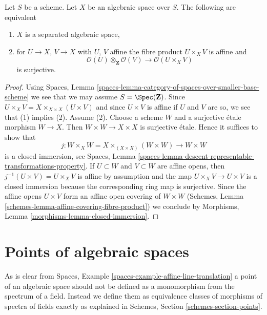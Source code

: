 \begin{lemma}
\label{lemma-characterize-separated}
Let $S$ be a scheme. Let $X$ be an algebraic space over $S$.
The following are equivalent
\begin{enumerate}
\item $X$ is a separated algebraic space,
\item for $U \to X$, $V \to X$ with $U$, $V$ affine
the fibre product $U \times_X V$ is affine and
$$
\mathcal{O}(U) \otimes_\mathbf{Z} \mathcal{O}(V)
\longrightarrow
\mathcal{O}(U \times_X V)
$$
is surjective.
\end{enumerate}
\end{lemma}

\begin{proof}
Using Spaces, Lemma
\ref{spaces-lemma-category-of-spaces-over-smaller-base-scheme}
we see that we may assume $S = \Spec(\mathbf{Z})$.
Since $U \times_X V = X \times_{X \times X} (U \times V)$
and since $U \times V$ is affine if $U$ and $V$ are so,
we see that (1) implies (2).
Assume (2). Choose a scheme $W$ and a surjective \'etale morphism
$W \to X$. Then $W \times W \to X \times X$ is surjective \'etale.
Hence it suffices to show that
$$
j : W \times_X W = X \times_{(X \times X)} (W \times W) \to W \times W
$$
is a closed immersion, see Spaces, Lemma
\ref{spaces-lemma-descent-representable-transformations-property}.
If $U \subset W$ and $V \subset W$ are affine opens, then
$j^{-1}(U \times V) = U \times_X V$ is affine by assumption
and the map $U \times_X V \to U \times V$ is a closed immersion
because the corresponding ring map is surjective.
Since the affine opens $U \times V$ form an affine open covering
of $W \times W$
(Schemes, Lemma \ref{schemes-lemma-affine-covering-fibre-product})
we conclude by
Morphisms, Lemma \ref{morphisms-lemma-closed-immersion}.
\end{proof}







\section{Points of algebraic spaces}
\label{section-points}

\noindent
As is clear from
Spaces, Example \ref{spaces-example-affine-line-translation}
a point of an algebraic space should not be defined as a monomorphism
from the spectrum of a field.
Instead we define them as equivalence classes of morphisms of spectra
of fields exactly as explained in
Schemes, Section \ref{schemes-section-points}.

